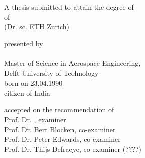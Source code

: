 
\begin{titlepage}

\begin{center}
	\large
	\begingroup
	\endgroup
	
	\hfill
	
	\vfill
	
	\begingroup
	\textbf{\spacedallcaps{\myTitle}}
	\endgroup
	
	\vfill
	
	\vfill
	
	\begingroup
	A thesis submitted to attain the degree of\\
	\vspace{2mm}
	 of \\
	(Dr. sc. ETH Zurich)
	\endgroup
	
	\vfill
	
	\begingroup
	presented by\\
	\vspace{2mm}
	\spacedlowsmallcaps{\myName}\\
	\vspace{8mm}
	Master of Science in Aerospace Engineering, \\
	Delft University of Technology \\
	\vspace{8mm}
	born on 23.04.1990\\
	\vspace{2mm}
	citizen of India
	\endgroup
	
	\vfill
	
	\begingroup
	accepted on the recommendation of\\
	\vspace{2mm}
	Prof. Dr. \myProf, examiner\\            
	Prof. Dr. Bert Blocken, co-examiner\\            	
	Prof. Dr. Peter Edwards, co-examiner\\            		
	Prof. Dr. Thijs Defraeye, co-examiner (????) \\
	\endgroup
	
	\vfill
	
	\myTime
	
	\vfill               
	
\end{center}  

\end{titlepage}